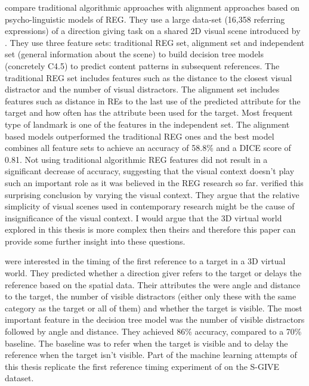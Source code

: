 \citet{viethen2011generating} compare traditional algorithmic approaches with alignment approaches based on psycho-linguistic models of REG. They use a large data-set (16,358 referring expressions) of a direction giving task on a shared 2D visual scene introduced by \citet{louwerse2007multimodal}. They use three feature sets: traditional REG set, alignment set and independent set (general information about the scene) to build decision tree models (concretely C4.5) to predict content patterns in subsequent references. The traditional REG set includes features such as the distance to the closest visual distractor and the number of visual distractors. The alignment set includes features such as distance in REs to the last use of the predicted attribute for the target and how often has the attribute been used for the target. Most frequent type of landmark is one of the features in the independent set. The alignment based models outperformed the traditional REG ones and the best model combines all feature sets to achieve an accuracy of 58.8\% and a DICE score of 0.81. Not using traditional algorithmic REG features did not result in a significant decrease of accuracy, suggesting that the visual context doesn't play such an important role as it was believed in the REG research so far.  \citet{viethen2011impact} verified this surprising conclusion by varying the visual context. They argue that the relative simplicity of visual scenes used in contemporary research might be the cause of insignificance of the visual context. I would argue that the 3D virtual world explored in this thesis is more complex then theirs and therefore this paper can provide some further insight into these questions.  

\citet{stoia2006sentence} were interested in the timing of the first reference to a target in a 3D virtual world. They predicted whether a direction giver refers to the target or delays the reference based on the spatial data. Their attributes the were angle and distance to the target, the number of visible distractors (either only these with the same category as the target or all of them) and whether the target is visible. The most important feature in the decision tree model was the number of visible distractors followed by angle and distance. They achieved 86\% accuracy, compared to a 70\% baseline. The baseline was to refer when the target is visible and to delay the reference when the target isn't visible. Part of the machine learning attempts of this thesis replicate the first reference timing experiment of \citet{stoia2006sentence} on the S-GIVE dataset.

